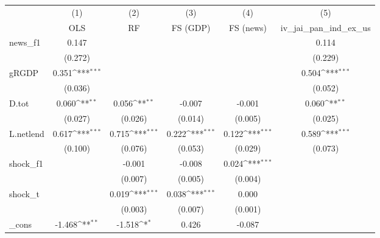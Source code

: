 {
\def\sym#1{\ifmmode^{#1}\else\(^{#1}\)\fi}
\begin{tabular}{l*{5}{c}}
\toprule
            &\multicolumn{1}{c}{(1)}&\multicolumn{1}{c}{(2)}&\multicolumn{1}{c}{(3)}&\multicolumn{1}{c}{(4)}&\multicolumn{1}{c}{(5)}\\
            &\multicolumn{1}{c}{OLS}&\multicolumn{1}{c}{RF}&\multicolumn{1}{c}{FS (GDP)}&\multicolumn{1}{c}{FS (news)}&\multicolumn{1}{c}{iv\_jai\_pan\_ind\_ex\_us}\\
\midrule
news\_f1     &       0.147         &                     &                     &                     &       0.114         \\
            &     (0.272)         &                     &                     &                     &     (0.229)         \\
\addlinespace
gRGDP       &       0.351\sym{***}&                     &                     &                     &       0.504\sym{***}\\
            &     (0.036)         &                     &                     &                     &     (0.052)         \\
\addlinespace
D.tot       &       0.060\sym{**} &       0.056\sym{**} &      -0.007         &      -0.001         &       0.060\sym{**} \\
            &     (0.027)         &     (0.026)         &     (0.014)         &     (0.005)         &     (0.025)         \\
\addlinespace
L.netlend   &       0.617\sym{***}&       0.715\sym{***}&       0.222\sym{***}&       0.122\sym{***}&       0.589\sym{***}\\
            &     (0.100)         &     (0.076)         &     (0.053)         &     (0.029)         &     (0.073)         \\
\addlinespace
shock\_f1    &                     &      -0.001         &      -0.008         &       0.024\sym{***}&                     \\
            &                     &     (0.007)         &     (0.005)         &     (0.004)         &                     \\
\addlinespace
shock\_t     &                     &       0.019\sym{***}&       0.038\sym{***}&       0.000         &                     \\
            &                     &     (0.003)         &     (0.007)         &     (0.001)         &                     \\
\addlinespace
\_cons      &      -1.468\sym{**} &      -1.518\sym{*}  &       0.426         &      -0.087         &                     \\

\end{tabular}}
